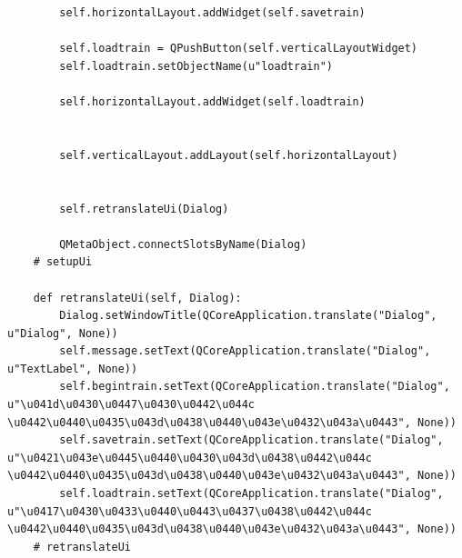 \documentclass[a4paper,14pt]{extarticle}
\begin{document}
\begin{verbatim}
        self.horizontalLayout.addWidget(self.savetrain)

        self.loadtrain = QPushButton(self.verticalLayoutWidget)
        self.loadtrain.setObjectName(u"loadtrain")

        self.horizontalLayout.addWidget(self.loadtrain)


        self.verticalLayout.addLayout(self.horizontalLayout)


        self.retranslateUi(Dialog)

        QMetaObject.connectSlotsByName(Dialog)
    # setupUi

    def retranslateUi(self, Dialog):
        Dialog.setWindowTitle(QCoreApplication.translate("Dialog", u"Dialog", None))
        self.message.setText(QCoreApplication.translate("Dialog", u"TextLabel", None))
        self.begintrain.setText(QCoreApplication.translate("Dialog", u"\u041d\u0430\u0447\u0430\u0442\u044c \u0442\u0440\u0435\u043d\u0438\u0440\u043e\u0432\u043a\u0443", None))
        self.savetrain.setText(QCoreApplication.translate("Dialog", u"\u0421\u043e\u0445\u0440\u0430\u043d\u0438\u0442\u044c \u0442\u0440\u0435\u043d\u0438\u0440\u043e\u0432\u043a\u0443", None))
        self.loadtrain.setText(QCoreApplication.translate("Dialog", u"\u0417\u0430\u0433\u0440\u0443\u0437\u0438\u0442\u044c \u0442\u0440\u0435\u043d\u0438\u0440\u043e\u0432\u043a\u0443", None))
    # retranslateUi
\end{verbatim}
\end{document}
